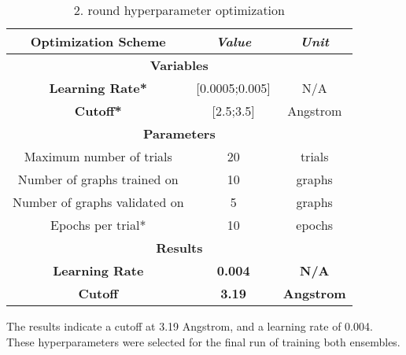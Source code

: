 \begin{table}[H]
    \centering
    \caption{2. round hyperparameter optimization}
    \label{tab:second-hyper}
    \begin{tabular}{|ccc|}
        \hline
        \multicolumn{1}{|c|}{\textbf{Optimization Scheme}}  & \multicolumn{1}{c|}{\textit{\textbf{Value}}} & \textit{\textbf{Unit}} \\ \hline
        \multicolumn{3}{|c|}{\textbf{Variables}}                                                                                    \\ \hline
        \multicolumn{1}{|c|}{\textbf{Learning Rate*}}       & \multicolumn{1}{c|}{{[}0.0005;0.005{]}}      & N/A                    \\ \hline
        \multicolumn{1}{|c|}{\textbf{Cutoff*}}              & \multicolumn{1}{c|}{{[}2.5;3.5{]}}           & Angstrom               \\ \hline
        \multicolumn{3}{|c|}{\textbf{Parameters}}                                                                                   \\ \hline
        \multicolumn{1}{|c|}{Maximum number of trials}      & \multicolumn{1}{c|}{20}                      & trials                 \\ \hline
        \multicolumn{1}{|c|}{Number of graphs trained on}   & \multicolumn{1}{c|}{10}                      & graphs                 \\ \hline
        \multicolumn{1}{|c|}{Number of graphs validated on} & \multicolumn{1}{c|}{5}                       & graphs                 \\ \hline
        \multicolumn{1}{|c|}{Epochs per trial*}             & \multicolumn{1}{c|}{10}                      & epochs                 \\ \hline
        \multicolumn{3}{|c|}{\textbf{Results}}                                                                                      \\ \hline
        \multicolumn{1}{|c|}{\textbf{Learning Rate}}        & \multicolumn{1}{c|}{\textbf{0.004}}          & \textbf{N/A}           \\ \hline
        \multicolumn{1}{|c|}{\textbf{Cutoff}}               & \multicolumn{1}{c|}{\textbf{3.19}}           & \textbf{Angstrom}      \\ \hline
    \end{tabular}
\end{table}

The results indicate a cutoff  at 3.19 Angstrom, and a learning rate of 0.004. These hyperparameters were selected for the final run of training
both ensembles.

